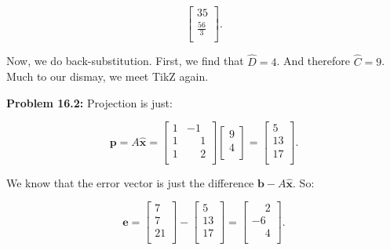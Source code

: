 \documentclass{article}
\begin{document}
\[
\begin{bmatrix}
35\\
\frac{56}{3}\\
\end{bmatrix}.
\]

Now, we do back-substitution. First, we find that $\widehat{D} = 4$. And therefore $\widehat{C} = 9$. Much to our dismay, we meet TikZ again.

\begin{center}
\end{center}

\noindent \textbf{Problem 16.2:} Projection is just:

\[
\mathbf{p} = A\widehat{\mathbf{x}} = \begin{bmatrix}
1 & -1\\
1 & \phantom{-}1\\
1 & \phantom{-}2\\
\end{bmatrix}
\begin{bmatrix}
9\\
4\\
\end{bmatrix}
=
\begin{bmatrix}
5\\
13\\
17\\
\end{bmatrix}.
\]

We know that the error vector is just the difference $\mathbf{b} - A\widehat{\mathbf{x}}$. So:

\[
\mathbf{e} = \begin{bmatrix}
7\\
7\\
21\\
\end{bmatrix}
-
\begin{bmatrix}
5\\
13\\
17\\
\end{bmatrix}
=
\begin{bmatrix}
\phantom{-}2\\
-6\\
\phantom{-}4\\
\end{bmatrix}.
\]
\end{document}
